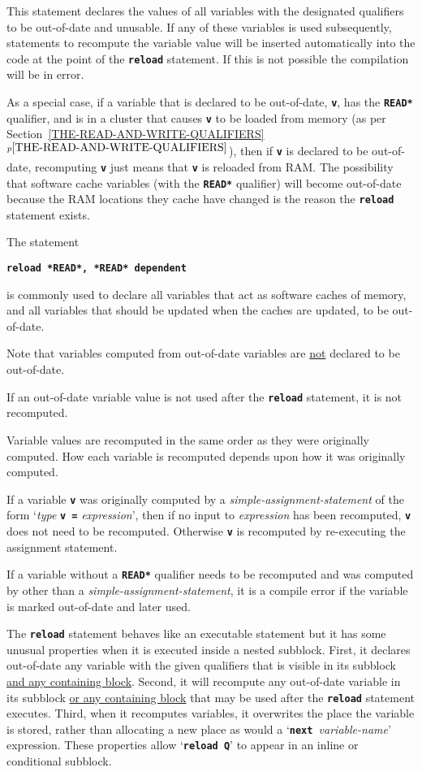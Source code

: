 \documentclass[12pt]{article}
\newcommand{\TT}[1]{{\tt \bfseries #1}}
\newcommand{\itemref}[1]{\ref{#1}$^{p\pageref{#1}}$}
\begin{document}
This statement declares the values of all variables with the designated
qualifiers to be out-of-date and unusable.  If any of these variables
is used subsequently, statements to recompute the variable value
will be inserted automatically into the code at the point of the
\TT{reload} statement.  If this is not possible the compilation will
be in error.

As a special case, if a variable that is declared to be out-of-date,
\TT{v}, has the \TT{*READ*} qualifier, and is in
a cluster that causes \TT{v} to be loaded from memory
(as per Section~\itemref{THE-READ-AND-WRITE-QUALIFIERS}),
then if \TT{v} is declared
to be out-of-date, recomputing \TT{v} just means that \TT{v}
is reloaded from RAM.  The possibility that software cache
variables (with the \TT{*READ*} qualifier) will become out-of-date because
the RAM locations they cache have changed is the reason the \TT{reload}
statement exists.

The statement
\begin{center}
\TT{reload *READ*, *READ* dependent}
\end{center}
is commonly used to declare all
variables that act as software caches of memory, and all variables
that should be updated when the caches are updated, to be out-of-date.

Note that variables computed from out-of-date variables are \underline{not}
declared to be out-of-date.

If an out-of-date variable value is not used after the \TT{reload} statement,
it is not recomputed.

Variable values are recomputed in the same order as they were
originally computed.  How each variable is recomputed depends upon
how it was originally computed.

If a variable \TT{v} was originally computed by
a {\em simple-assignment-statement}
of the form `{\em type} \TT{v =} {\em expression}', then if
no input to {\em expression} has been recomputed, \TT{v} does not
need to be recomputed.  Otherwise \TT{v} is recomputed by re-executing
the assignment statement.

If a variable without a \TT{*READ*} qualifier needs to be
recomputed and was computed by other than
a {\em simple-assignment-statement}, it is a compile error if the
variable is marked out-of-date and later used.

The \TT{reload} statement behaves like an executable statement but
it has some unusual properties when it is executed inside a
nested subblock.  First, it declares out-of-date any variable with
the given qualifiers that is visible in its subblock \underline{and any
containing block}.
Second, it will recompute any out-of-date variable in its subblock
\underline{or any containing block} that may be used after the
\TT{reload} statement executes.
Third, when it recomputes variables, it overwrites
the place the variable is stored, rather than allocating a new
place as would a `\TT{next~}{\em variable-name}' expression.
These properties allow `\TT{reload Q}' to appear in an inline
or conditional subblock.
\end{document}
